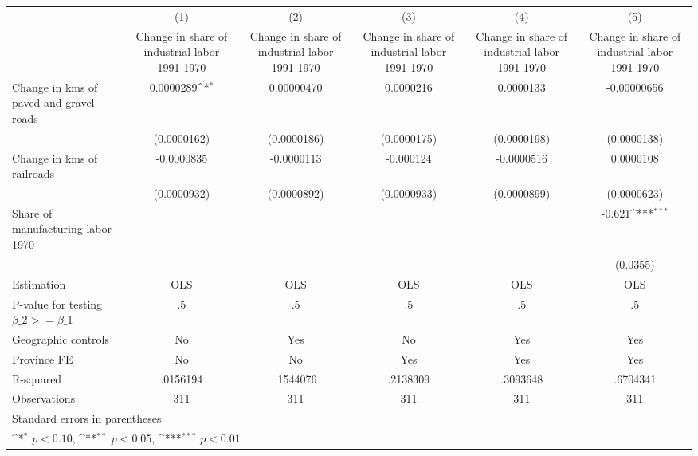 {
\def\sym#1{\ifmmode^{#1}\else\(^{#1}\)\fi}
\begin{tabular}{l*{5}{c}}
\hline\hline
                    &\multicolumn{1}{c}{(1)}&\multicolumn{1}{c}{(2)}&\multicolumn{1}{c}{(3)}&\multicolumn{1}{c}{(4)}&\multicolumn{1}{c}{(5)}\\
                    &\multicolumn{1}{c}{Change in share of industrial labor 1991-1970}&\multicolumn{1}{c}{Change in share of industrial labor 1991-1970}&\multicolumn{1}{c}{Change in share of industrial labor 1991-1970}&\multicolumn{1}{c}{Change in share of industrial labor 1991-1970}&\multicolumn{1}{c}{Change in share of industrial labor 1991-1970}\\
\hline
Change in kms of paved and gravel roads&   0.0000289\sym{*}  &  0.00000470         &   0.0000216         &   0.0000133         & -0.00000656         \\
                    & (0.0000162)         & (0.0000186)         & (0.0000175)         & (0.0000198)         & (0.0000138)         \\
[1em]
Change in kms of railroads&  -0.0000835         &  -0.0000113         &   -0.000124         &  -0.0000516         &   0.0000108         \\
                    & (0.0000932)         & (0.0000892)         & (0.0000933)         & (0.0000899)         & (0.0000623)         \\
[1em]
Share of manufacturing labor 1970&                     &                     &                     &                     &      -0.621\sym{***}\\
                    &                     &                     &                     &                     &    (0.0355)         \\
\hline
Estimation          &         OLS         &         OLS         &         OLS         &         OLS         &         OLS         \\
P-value for testing $\beta\_2 >= \beta\_1$&          .5         &          .5         &          .5         &          .5         &          .5         \\
Geographic controls &          No         &         Yes         &          No         &         Yes         &         Yes         \\
Province FE         &          No         &          No         &         Yes         &         Yes         &         Yes         \\
R-squared           &    .0156194         &    .1544076         &    .2138309         &    .3093648         &    .6704341         \\
Observations        &         311         &         311         &         311         &         311         &         311         \\
\hline\hline
\multicolumn{6}{l}{\footnotesize Standard errors in parentheses}\\
\multicolumn{6}{l}{\footnotesize \sym{*} \(p<0.10\), \sym{**} \(p<0.05\), \sym{***} \(p<0.01\)}\\
\end{tabular}
}
